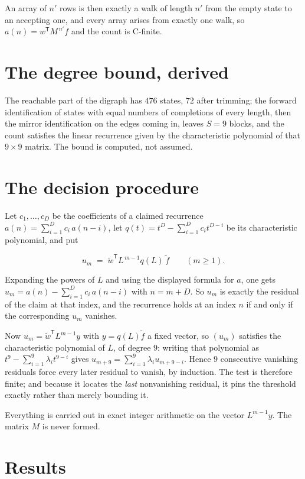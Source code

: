 \documentclass[11pt]{article}
\theoremstyle{definition}
\begin{document}
An array of $n'$ rows is then exactly a walk of length $n'$ from the empty state to an accepting one, and every array arises from exactly one walk, so $a(n) = w^{\mathsf T}M^{\,n'}f$ and the count is C-finite.

\section{The degree bound, derived}

The reachable part of the digraph has $476$ states, $72$ after trimming; the forward identification of states with equal numbers of completions of every length, then the mirror identification on the edges coming in, leaves $S = 9$ blocks, and the count satisfies the linear recurrence given by the characteristic polynomial of that $9\times9$ matrix. The bound is computed, not assumed.

\section{The decision procedure}

Let $c_1,\dots,c_D$ be the coefficients of a claimed recurrence $a(n) = \sum_{i=1}^{D} c_i\,a(n-i)$, let $q(t) = t^{D} - \sum_{i=1}^{D} c_i t^{D-i}$ be its characteristic polynomial, and put

\[u_m \;=\; \tilde w^{\mathsf T} L^{\,m-1} q(L)\,\tilde f \qquad (m \ge 1).\]

Expanding the powers of $L$ and using the displayed formula for $a$, one gets $u_m = a(n) - \sum_{i=1}^{D} c_i\,a(n-i)$ with $n = m + D$. So $u_m$ is exactly the residual of the claim at that index, and the recurrence holds at an index $n$ if and only if the corresponding $u_m$ vanishes.

Now $u_m = \tilde w^{\mathsf T} L^{m-1} y$ with $y = q(L)\tilde f$ a fixed vector, so $(u_m)$ satisfies the characteristic polynomial of $L$, of degree $9$: writing that polynomial as $t^{9} - \sum_{i=1}^{9} \lambda_i t^{9-i}$ gives $u_{m+9} = \sum_{i=1}^{9} \lambda_i u_{m+9-i}$. Hence $9$ consecutive vanishing residuals force every later residual to vanish, by induction. The test is therefore finite; and because it locates the {\itshape last} nonvanishing residual, it pins the threshold exactly rather than merely bounding it.

Everything is carried out in exact integer arithmetic on the vector $L^{m-1}y$. The matrix $M$ is never formed.

\section{Results}
\end{document}

